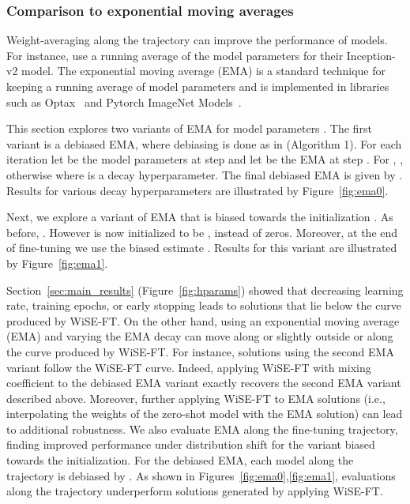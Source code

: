 \subsubsection{Comparison to exponential moving averages}\label{sec:ema}

Weight-averaging along the trajectory can improve the performance of models.
For instance, \citet{szegedy2016rethinking} use a running average of the model parameters for their Inception-v2 model.
The exponential moving average (EMA) is a standard technique for keeping a running average of model parameters and
is implemented in libraries such as Optax~\cite{optax2020github} and Pytorch ImageNet Models~\cite{rw2019timm}.

This section explores two variants of EMA for model parameters . The first variant is a debiased EMA, where debiasing is done as in \citet{kingma2014adam} (Algorithm 1).
For each iteration  let  be the model parameters at step  and let  be the EMA at step . For , , otherwise  where  is a decay hyperparameter. 
The final debiased EMA is given by . Results for various decay hyperparameters are illustrated by Figure~\ref{fig:ema0}.

Next, we explore a variant of EMA that is biased towards the initialization . As before, . However  is now initialized to be , instead of zeros. Moreover, at the end of fine-tuning we use the biased estimate . Results for this variant are illustrated by Figure~\ref{fig:ema1}.

Section~\ref{sec:main_results} (Figure~\ref{fig:hparams}) showed that decreasing learning rate, training epochs, or early stopping leads to solutions that lie below the curve produced by WiSE-FT.
On the other hand, using an exponential moving average (EMA) and varying the EMA decay  can move along or slightly outside or along the curve produced
by WiSE-FT.
For instance, solutions using the second EMA variant follow the WiSE-FT curve.
Indeed, applying WiSE-FT with mixing coefficient  to the debiased EMA variant exactly recovers the second EMA variant described above.
Moreover, further applying WiSE-FT to EMA solutions (i.e., interpolating the weights of the zero-shot model with the EMA solution)
can lead to additional robustness. We also evaluate EMA along the fine-tuning trajectory,
finding improved performance under distribution shift for the variant biased towards the initialization.
For the debiased EMA, each model along the trajectory is debiased by .
As shown in Figures~\ref{fig:ema0},\ref{fig:ema1}, evaluations along the trajectory underperform solutions generated by applying WiSE-FT.


